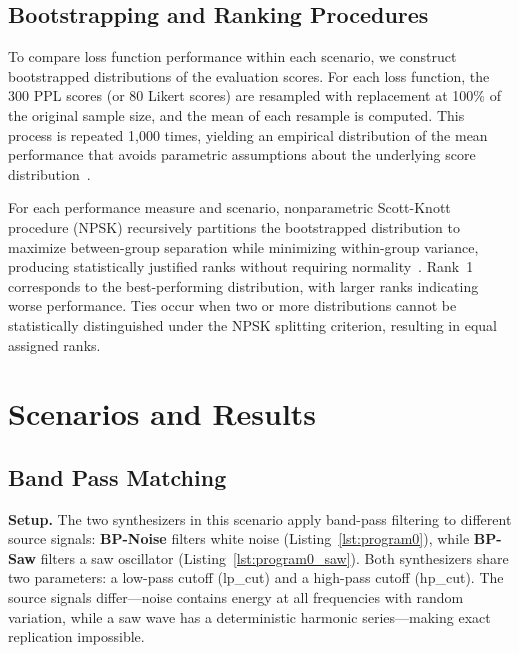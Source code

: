 \documentclass[10pt]{article} %
\newcommand{\BPNoise}{\textbf{BP-Noise}\xspace}
\newcommand{\BPSaw}{\textbf{BP-Saw}\xspace}
\begin{document}
\subsection{Bootstrapping and Ranking Procedures}
\label{sec:bootstrapping_ranking}

To compare loss function performance within each scenario, we construct bootstrapped distributions of the evaluation scores. For each loss function, the 300 PPL scores (or 80 Likert scores) are resampled with replacement at 100\% of the original sample size, and the mean of each resample is computed. This process is repeated 1,000 times, yielding an empirical distribution of the mean performance that avoids parametric assumptions about the underlying score distribution~\cite{chernick2011bootstrap}.

For each performance measure and scenario, nonparametric Scott-Knott procedure (NPSK) recursively partitions the bootstrapped distribution to maximize between-group separation while minimizing within-group variance, producing statistically justified ranks without requiring normality~\cite{tantithamthavorn2017mvt,tantithamthavorn2018optimization}. Rank~1 corresponds to the best-performing distribution, with larger ranks indicating worse performance. Ties occur when two or more distributions cannot be statistically distinguished under the NPSK splitting criterion, resulting in equal assigned ranks.



\section{Scenarios and Results}
\label{sec:scenarios}


\subsection{Band Pass Matching}
\label{sec:scenario_bp_saw_noise}


\textbf{Setup.} The two synthesizers in this scenario apply band-pass filtering to different source signals: \BPNoise filters white noise (Listing~\ref{lst:program0}), while \BPSaw filters a saw oscillator (Listing~\ref{lst:program0_saw}). Both synthesizers share two parameters: a low-pass cutoff (lp\_cut) and a high-pass cutoff (hp\_cut). The source signals differ---noise contains energy at all frequencies with random variation, while a saw wave has a deterministic harmonic series---making exact replication impossible.
\end{document}
